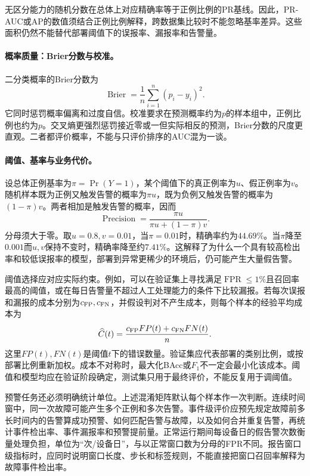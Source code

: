 无区分能力的随机分数在总体上对应精确率等于正例比例的PR基线。因此，PR-AUC或AP的数值须结合正例比例解释，跨数据集比较时不能忽略基率差异。这些面积仍然不能替代部署阈值下的误报率、漏报率和告警量。

\paragraph{概率质量：Brier分数与校准。}
二分类概率的Brier分数为
\begin{equation}
 \operatorname{Brier}=\frac1n\sum_{i=1}^n(p_i-y_i)^2.
 \label{eq:classification-brier}
\end{equation}
它同时惩罚概率偏离和过度自信。校准要求在预测概率约为$p$的样本组中，正例比例也约为$p$。交叉熵更强烈惩罚接近零或一但实际相反的预测，Brier分数的尺度更直观。二者都评价概率，不能与只评价排序的AUC混为一谈。

\paragraph{阈值、基率与业务代价。}
设总体正例基率为$\pi=\Pr(Y=1)$，某个阈值下的真正例率为$u$、假正例率为$v$。随机样本既为正例又触发告警的概率为$\pi u$，既为负例又触发告警的概率为$(1-\pi)v$。两者相加是触发告警的概率，因而
\begin{equation}
 \operatorname{Precision}=\frac{\pi u}{\pi u+(1-\pi)v}.
 \label{eq:classification-prevalence}
\end{equation}
分母须大于零。取$u=0.8,v=0.01$，当$\pi=0.01$时，精确率约为$44.69\%$。当$\pi$降至$0.001$而$u,v$保持不变时，精确率降至约$7.41\%$。这解释了为什么一个具有较高检出率和较低误报率的模型，部署到异常更稀少的环境后，仍可能产生大量假告警。

阈值选择应对应实际约束。例如，可以在验证集上寻找满足$\operatorname{FPR}\leq1\%$且召回率最高的阈值，或在每日告警量不超过人工处理能力的条件下比较漏报。若每次误报和漏报的成本分别为$c_{\rm FP},c_{\rm FN}$，并假设判对不产生成本，则每个样本的经验平均成本为
\begin{equation}
 \widehat C(t)=\frac{c_{\rm FP}FP(t)+c_{\rm FN}FN(t)}n.
 \label{eq:classification-alarm-cost}
\end{equation}
这里$FP(t),FN(t)$是阈值$t$下的错误数量。验证集应代表部署的类别比例，或按部署比例重新加权。成本不对称时，最大化BAcc或$F_1$不一定会最小化该成本。阈值和模型均应在验证阶段确定，测试集只用于最终评价，不能反复用于调阈值。

预警任务还必须明确统计单位。上述混淆矩阵默认每个样本作一次判断。连续时间窗中，同一次故障可能产生多个正例和多次告警。事件级评价应预先规定故障前多长时间内的告警算成功预警、如何匹配告警与故障，以及如何合并重复告警，再统计事件检出率、事件漏报率和预警提前量。正常运行期间每设备日的假告警次数衡量处理负担，单位为“次/设备日”，与以正常窗口数为分母的FPR不同。报告窗口级指标时，应同时说明窗口长度、步长和标签规则，不能直接把窗口召回率解释为故障事件检出率。

